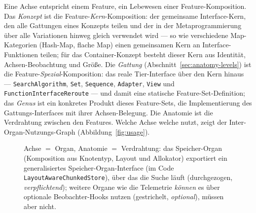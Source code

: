 \begin{nurlang}
Eine Achse entspricht einem Feature, ein Lebewesen einer Feature-Komposition. Das \emph{Konzept} ist die
Feature-\emph{Kern}-Komposition: der gemeinsame Interface-Kern, den alle Gattungen eines Konzepts teilen und
der in der Metaprogrammierung über alle Variationen hinweg gleich verwendet wird --- so wie verschiedene
Map-Kategorien (Hash-Map, flache Map) einen gemeinsamen Kern an Interface-Funktionen teilen; für das
Container-Konzept besteht dieser Kern aus Identität, Achsen-Beobachtung und Größe. Die \emph{Gattung}
(Abschnitt~\ref{sec:anatomy-levels}) ist die Feature-\emph{Spezial}-Komposition:
das reale Tier-Interface über den Kern hinaus --- \texttt{SearchAlgorithm}, \texttt{Set},
\texttt{Sequence}, \texttt{Adapter}, \texttt{View} und \texttt{FunctionInterfaceReroute} --- und damit
eine statische Feature-Set-Definition; das \emph{Genus} ist ein konkretes Produkt dieses Feature-Sets, die
Implementierung des Gattungs-Interfaces mit ihrer Achsen-Belegung. Die Anatomie ist die Verdrahtung zwischen den Features. Welche
Achse welche nutzt, zeigt der Inter-Organ-Nutzungs-Graph (Abbildung~\ref{fig:usage}).
\begin{figure}[htbp]\centering
{}
\caption{Achse $=$ Organ, Anatomie $=$ Verdrahtung: das Speicher-Organ (Komposition aus Knotentyp, Layout und Allokator) exportiert ein generalisiertes Speicher-Organ-Interface (im Code \texttt{LayoutAwareChunkedStore}), über das die Suche läuft (durchgezogen, \emph{verpflichtend}); weitere Organe wie die Telemetrie \emph{können} es über optionale Beobachter-Hooks nutzen (gestrichelt, \emph{optional}), müssen aber nicht.}\label{fig:axis-organ}
\end{figure}
\end{nurlang}

